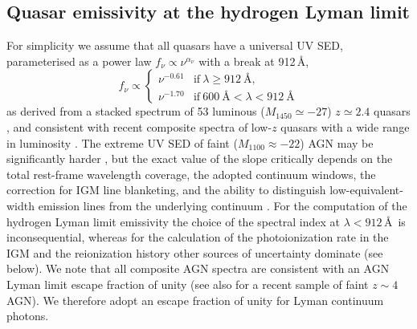\documentclass[fleqn,usenatbib]{mnras}
\begin{document}
\subsection{Quasar emissivity at the hydrogen Lyman limit}
\label{sec:e912}

For simplicity we assume that all quasars have a universal UV SED,
parameterised as a power law $f_\nu\propto\nu^{\alpha_\nu}$
with a break at 912\,\AA,
\begin{equation}
  f_\nu\propto\begin{cases}
  \nu^{-0.61} & \text{if}~\lambda\ge 912~\text{\AA},\\
  \nu^{-1.70} & \text{if}~600~\text{\AA}<\lambda<912~\text{\AA}                
  \end{cases}
  \label{eqn:sed}
\end{equation}
as derived from a stacked spectrum of 53 luminous ($M_{1450}\simeq
-27$) $z\simeq 2.4$ quasars \citep{2015MNRAS.449.4204L}, and
consistent with recent composite spectra of low-$z$ quasars with a
wide range in luminosity \citep{2012ApJ...752..162S,
  2014ApJ...794...75S}.  The extreme UV SED of faint ($M_{1100}\approx
-22$) AGN may be significantly harder
\citep[$\alpha_\nu=-0.56$,][]{2004ApJ...615..135S}, but the exact
value of the slope critically depends on the total rest-frame
wavelength coverage, the adopted continuum windows, the correction for
IGM line blanketing, and the ability to distinguish
low-equivalent-width emission lines from the underlying continuum
\citep{2014ApJ...794...75S,2015MNRAS.449.4204L,2016ApJ...817...56T}.
For the computation of the hydrogen Lyman limit emissivity the choice
of the spectral index at $\lambda<912$\,\AA\ is inconsequential,
whereas for the calculation of the  photoionization rate in
the IGM and the  reionization history other sources of
uncertainty dominate (see below).  We note that all composite AGN
spectra are consistent with an AGN Lyman limit escape fraction of
unity (see also \citealt{2018A&A...613A..44G} for a recent sample of
faint $z\sim 4$ AGN).  We therefore adopt an escape fraction of unity
for Lyman continuum photons.
\end{document}
